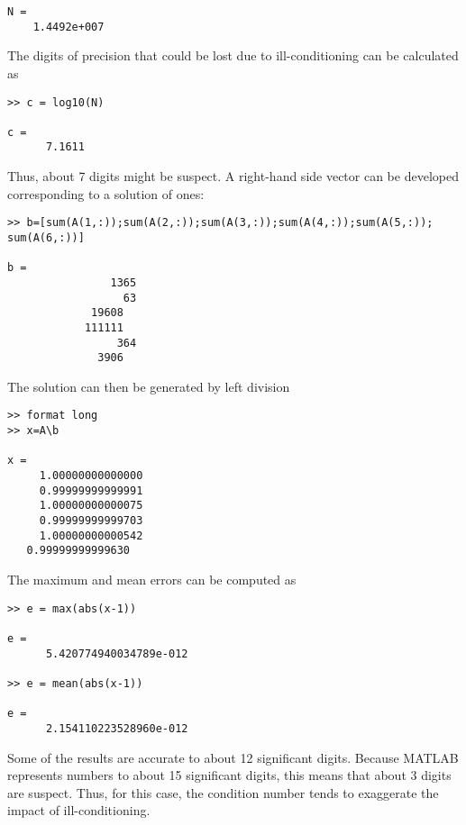 \documentclass[../main.tex]{subfiles}
\begin{document}
\begin{enumerate}[label=\bfseries(\alph*)]
\begin{lstlisting}[numbers=none]
N =
 	1.4492e+007
\end{lstlisting} 
\bigbreak
The digits of precision that could be lost due to ill-conditioning can be calculated as
\bigbreak
\begin{lstlisting}[numbers=none]
>> c = log10(N)

c =
	  7.1611
\end{lstlisting} 
\bigbreak
Thus, about 7 digits might be suspect. A right-hand side vector can be developed
corresponding to a solution of ones: 
\bigbreak
\begin{lstlisting}[numbers=none]
>> b=[sum(A(1,:));sum(A(2,:));sum(A(3,:));sum(A(4,:));sum(A(5,:));
sum(A(6,:))]

b =
 				1365
 			 	  63
 			 19608
 			111111
				 364
			  3906 
\end{lstlisting} 
\bigbreak
The solution can then be generated by left division
\bigbreak
\begin{lstlisting}[numbers=none]
>> format long
>> x=A\b

x =
 	 1.00000000000000
 	 0.99999999999991
 	 1.00000000000075
	 0.99999999999703
	 1.00000000000542
   0.99999999999630 
\end{lstlisting} 
\bigbreak
The maximum and mean errors can be computed as
\bigbreak
\begin{lstlisting}[numbers=none]
>> e = max(abs(x-1))

e =
	  5.420774940034789e-012
 
>> e = mean(abs(x-1))

e =
 	  2.154110223528960e-012 
\end{lstlisting} 
\bigbreak
Some of the results are accurate to about 12 significant digits. Because MATLAB
\smallbreak represents numbers to about 15 significant digits, this means that about 3 digits are suspect.
\smallbreak Thus, for this case, the condition number tends to exaggerate the impact of ill-conditioning. 
\bigbreak



\end{enumerate}
\end{document}
